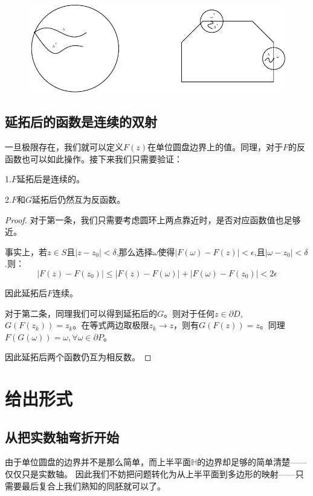 \documentclass[UTF8]{ctexart}[a4paper,10pt]
\def\H{\mathbb{H}}
\begin{document}
    \begin{figure}[H]
        \centering
        \includegraphics[scale=0.8]{定理2.2.pdf}
    \end{figure}
    \subsection{延拓后的函数是连续的双射}
    一旦极限存在，我们就可以定义$F(z)$在单位圆盘边界上的值。同理，对于$F$的反函数也可以如此操作。接下来我们只需要验证：

    1.$F$延拓后是连续的。

    2.$F$和$G$延拓后仍然互为反函数。

    \begin{proof}
        \quad

        对于第一条，我们只需要考虑圆环上两点靠近时，是否对应函数值也足够近。
        
        事实上，若$z \in S$且$|z-z_0|<\delta$,那么选择$\omega$使得$|F(\omega)-F(z)|<\epsilon$,且$|\omega-z_0|<\delta$.则：
        $$
        |F(z)-F(z_0)|\leq|F(z)-F(\omega)|+|F(\omega)-F(z_0)|<2\epsilon
        $$
        
        因此延拓后$F$连续。

        对于第二条，同理我们可以得到延拓后的$G$。则对于任何$z \in \partial D$,$G(F(z_k))=z_k$。在等式两边取极限$z_k \to z$，则有$G(F(z))=z$。同理$F(G(\omega))=\omega,\forall \omega \in \partial P$。
        
        因此延拓后两个函数仍互为相反数。
    \end{proof}
    \section{给出形式}
    \subsection{从把实数轴弯折开始}
    由于单位圆盘的边界并不是那么简单，而上半平面$\H$的边界却足够的简单清楚——仅仅只是实数轴。
    因此我们不妨把问题转化为从上半平面到多边形的映射——只需要最后复合上我们熟知的同胚就可以了。
    
\end{document}
